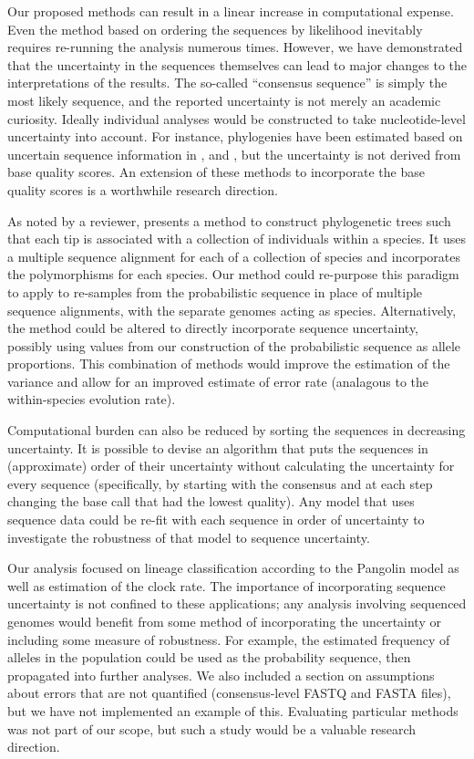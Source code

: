 \documentclass[12pt]{article}
\begin{document}
Our proposed methods can result in a linear increase in computational expense.
Even the method based on ordering the sequences by likelihood inevitably requires re-running the analysis numerous times.
However, we have demonstrated that the uncertainty in the sequences themselves can lead to major changes to the interpretations of the results.
The so-called ``consensus sequence'' is simply the most likely sequence, and the reported uncertainty is not merely an academic curiosity.
Ideally individual analyses would be constructed to take nucleotide-level uncertainty into account.
For instance, phylogenies have been estimated based on uncertain sequence information in \cite{rossOncoNEMInferringTumor2016}, \cite{jahnTreeInferenceSinglecell2016} and \cite{zafarSiFitInferringTumor2017}, but the uncertainty is not derived from base quality scores.
An extension of these methods to incorporate the base quality scores is a worthwhile research direction.

As noted by a reviewer, \cite{demaioLinkingGreatApes2013} presents a method to construct phylogenetic trees such that each tip is associated with a collection of individuals within a species.
It uses a multiple sequence alignment for each of a collection of species and incorporates the polymorphisms for each species.
Our method could re-purpose this paradigm to apply to re-samples from the probabilistic sequence in place of multiple sequence alignments, with the separate genomes acting as species.
Alternatively, the method could be altered to directly incorporate sequence uncertainty, possibly using values from our construction of the probabilistic sequence as allele proportions.
This combination of methods would improve the estimation of the variance and allow for an improved estimate of error rate (analagous to the within-species evolution rate).

Computational burden can also be reduced by sorting the sequences in decreasing uncertainty.
It is possible to devise an algorithm that puts the sequences in (approximate) order of their uncertainty without calculating the uncertainty for every sequence (specifically, by starting with the consensus and at each step changing the base call that had the lowest quality).
Any model that uses sequence data could be re-fit with each sequence in order of uncertainty to investigate the robustness of that model to sequence uncertainty.

Our analysis focused on lineage classification according to the Pangolin model as well as estimation of the clock rate.
The importance of incorporating sequence uncertainty is not confined to these applications; any analysis involving sequenced genomes would benefit from some method of incorporating the uncertainty or including some measure of robustness.
For example, the estimated frequency of alleles in the population could be used as the probability sequence, then propagated into further analyses.
We also included a section on assumptions about errors that are not quantified (consensus-level FASTQ and FASTA files), but we have not implemented an example of this.
Evaluating particular methods was not part of our scope, but such a study would be a valuable research direction.
\end{document}
